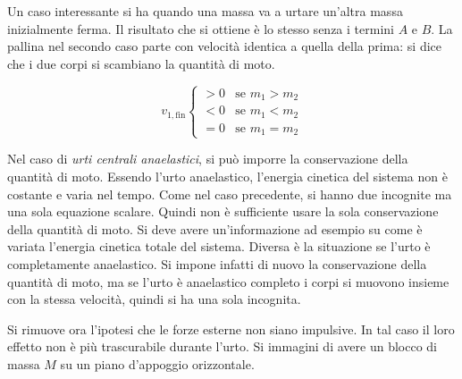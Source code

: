 \begin{figure}[htpb]
\end{figure}
\FloatBarrier
Un caso interessante si ha quando una massa va a urtare un'altra massa inizialmente ferma. Il risultato che si ottiene è lo stesso senza i termini $A$ e $B$. La pallina nel secondo caso parte con velocità identica a quella della prima: si dice che i due corpi si scambiano la quantità di moto.

\[
	v_{1,\text{fin}} \begin{cases}  >0 & \text{se $m_1>m_2$} \\ <0 & \text{se $m_1<m_2$} \\ =0 &\text{se $m_1=m_2$} \end{cases}
\]

Nel caso di \textit{urti centrali anaelastici}, si può imporre la conservazione della quantità di moto. Essendo l'urto anaelastico, l'energia cinetica del sistema non è costante e varia nel tempo. Come nel caso precedente, si hanno due incognite ma una sola equazione scalare. Quindi non è sufficiente usare la sola conservazione della quantità di moto. Si deve avere un'informazione ad esempio su come è variata l'energia cinetica totale del sistema. Diversa è la situazione se l'urto è completamente anaelastico. Si impone infatti di nuovo la conservazione della quantità di moto, ma se l'urto è anaelastico completo i corpi si muovono insieme con la stessa velocità, quindi si ha una sola incognita.

Si rimuove ora l'ipotesi che le forze esterne non siano impulsive. In tal caso il loro effetto non è più trascurabile durante l'urto. Si immagini di avere un blocco di massa $M$ su un piano d'appoggio orizzontale.

